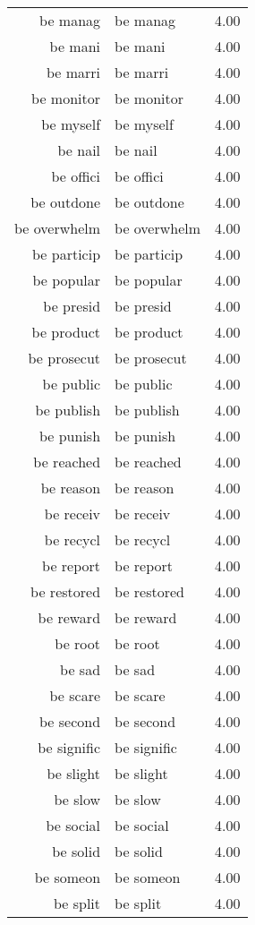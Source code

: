 \begin{table}[ht]
\begin{tabular}{rlr}
  be manag & be manag & 4.00 \\ 
  be mani & be mani & 4.00 \\ 
  be marri & be marri & 4.00 \\ 
  be monitor & be monitor & 4.00 \\ 
  be myself & be myself & 4.00 \\ 
  be nail & be nail & 4.00 \\ 
  be offici & be offici & 4.00 \\ 
  be outdone & be outdone & 4.00 \\ 
  be overwhelm & be overwhelm & 4.00 \\ 
  be particip & be particip & 4.00 \\ 
  be popular & be popular & 4.00 \\ 
  be presid & be presid & 4.00 \\ 
  be product & be product & 4.00 \\ 
  be prosecut & be prosecut & 4.00 \\ 
  be public & be public & 4.00 \\ 
  be publish & be publish & 4.00 \\ 
  be punish & be punish & 4.00 \\ 
  be reached & be reached & 4.00 \\ 
  be reason & be reason & 4.00 \\ 
  be receiv & be receiv & 4.00 \\ 
  be recycl & be recycl & 4.00 \\ 
  be report & be report & 4.00 \\ 
  be restored & be restored & 4.00 \\ 
  be reward & be reward & 4.00 \\ 
  be root & be root & 4.00 \\ 
  be sad & be sad & 4.00 \\ 
  be scare & be scare & 4.00 \\ 
  be second & be second & 4.00 \\ 
  be signific & be signific & 4.00 \\ 
  be slight & be slight & 4.00 \\ 
  be slow & be slow & 4.00 \\ 
  be social & be social & 4.00 \\ 
  be solid & be solid & 4.00 \\ 
  be someon & be someon & 4.00 \\ 
  be split & be split & 4.00 \\ 

\end{tabular}
\end{table}
